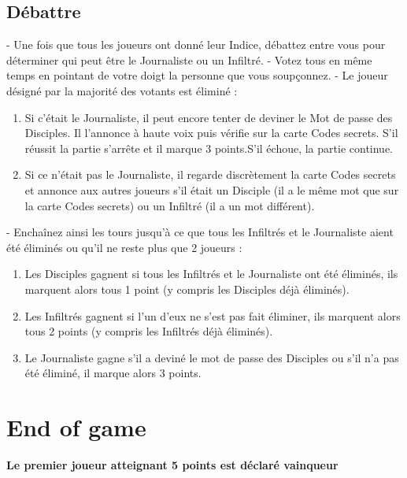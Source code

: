 \documentclass{article}%
\begin{document}
%
\subsection{ Débattre
}%
\label{subsec:Dbattre}%
{-} Une fois que tous les joueurs ont donné leur Indice, débattez entre vous pour déterminer qui peut être le Journaliste ou un Infiltré.
%
{-} Votez tous en même temps en pointant de votre doigt la personne que vous soupçonnez.
%
{-} Le joueur désigné par la majorité des votants est éliminé :
%
\begin{enumerate}%
\item%
 Si c’était le Journaliste, il peut encore tenter de deviner le Mot de passe des Disciples. Il l'annonce à haute voix puis vérifie sur la carte Codes secrets. S’il réussit la partie s’arrête et il marque 3 points.S’il échoue, la partie continue.
%
\item%
 Si ce n’était pas le Journaliste, il regarde discrètement la carte Codes secrets et annonce aux autres joueurs s’il était un Disciple (il a le même mot que sur la carte Codes secrets) ou un Infiltré (il a un mot différent).
%
\end{enumerate}%
{-} Enchaînez ainsi les tours jusqu’à ce que tous les Infiltrés et le Journaliste aient été éliminés ou qu’il ne reste plus que 2 joueurs :
%
\begin{enumerate}%
\item%
 Les Disciples gagnent si tous les Infiltrés et le Journaliste ont été éliminés, ils marquent alors tous 1 point (y compris les Disciples déjà éliminés).
%
\item%
 Les Infiltrés gagnent si l'un d'eux ne s'est pas fait éliminer, ils marquent alors tous 2 points (y compris les Infiltrés déjà éliminés).
%
\item%
 Le Journaliste gagne s'il a deviné le mot de passe des Disciples ou s'il n'a pas été éliminé, il marque alors 3 points.
%
\end{enumerate}

%
\section{ End of game
}%
\label{sec:Endofgame}%
\textbf{Le premier joueur atteignant 5 points est déclaré vainqueur}

%
\end{document}
